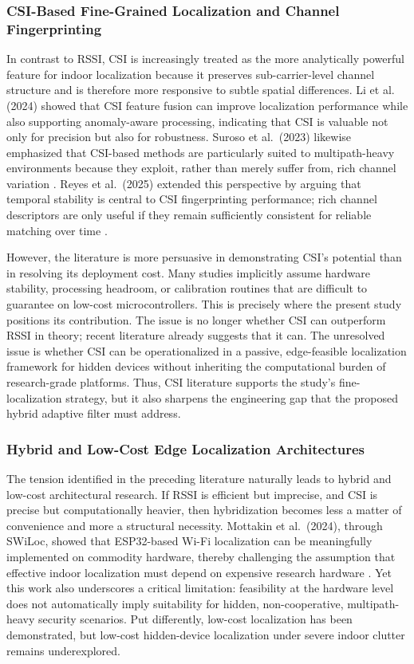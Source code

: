 \subsubsection{CSI-Based Fine-Grained Localization and Channel Fingerprinting}
In contrast to RSSI, CSI is increasingly treated as the more analytically powerful feature for indoor localization because it preserves sub-carrier-level channel structure and is therefore more responsive to subtle spatial differences. Li et al. (2024) showed that CSI feature fusion can improve localization performance while also supporting anomaly-aware processing, indicating that CSI is valuable not only for precision but also for robustness. Suroso et al.\ (2023) likewise emphasized that CSI-based methods are particularly suited to multipath-heavy environments because they exploit, rather than merely suffer from, rich channel variation \cite{suroso2023csi}. Reyes et al.\ (2025) extended this perspective by arguing that temporal stability is central to CSI fingerprinting performance; rich channel descriptors are only useful if they remain sufficiently consistent for reliable matching over time \cite{reyes2025temporal}.

However, the literature is more persuasive in demonstrating CSI's potential than in resolving its deployment cost. Many studies implicitly assume hardware stability, processing headroom, or calibration routines that are difficult to guarantee on low-cost microcontrollers. This is precisely where the present study positions its contribution. The issue is no longer whether CSI can outperform RSSI in theory; recent literature already suggests that it can. The unresolved issue is whether CSI can be operationalized in a passive, edge-feasible localization framework for hidden devices without inheriting the computational burden of research-grade platforms. Thus, CSI literature supports the study's fine-localization strategy, but it also sharpens the engineering gap that the proposed hybrid adaptive filter must address.

\subsubsection{Hybrid and Low-Cost Edge Localization Architectures}
The tension identified in the preceding literature naturally leads to hybrid and low-cost architectural research. If RSSI is efficient but imprecise, and CSI is precise but computationally heavier, then hybridization becomes less a matter of convenience and more a structural necessity. Mottakin et al.\ (2024), through SWiLoc, showed that ESP32-based Wi-Fi localization can be meaningfully implemented on commodity hardware, thereby challenging the assumption that effective indoor localization must depend on expensive research hardware \cite{mottakin2024swiloc}. Yet this work also underscores a critical limitation: feasibility at the hardware level does not automatically imply suitability for hidden, non-cooperative, multipath-heavy security scenarios. Put differently, low-cost localization has been demonstrated, but low-cost hidden-device localization under severe indoor clutter remains underexplored.


